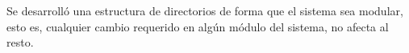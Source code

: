 \documentclass[%
        final,
        notitlepage,
        narroweqnarray,
        inline,
        ]{ieee}
\begin{document}
Se desarrolló una estructura de directorios de forma que el sistema sea modular, esto es, cualquier cambio requerido en algún módulo del sistema, no afecta al resto.


% 
\end{document}
